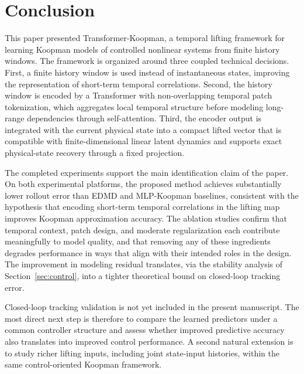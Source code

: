 \documentclass[journal]{IEEEtran}
\begin{document}
\section{Conclusion}
\label{sec:conclusion}

This paper presented Transformer-Koopman, a temporal lifting framework for learning Koopman models of controlled nonlinear systems from finite history windows. The framework is organized around three coupled technical decisions. First, a finite history window is used instead of instantaneous states, improving the representation of short-term temporal correlations. Second, the history window is encoded by a Transformer with non-overlapping temporal patch tokenization, which aggregates local temporal structure before modeling long-range dependencies through self-attention. Third, the encoder output is integrated with the current physical state into a compact lifted vector that is compatible with finite-dimensional linear latent dynamics and supports exact physical-state recovery through a fixed projection.

The completed experiments support the main identification claim of the paper. On both experimental platforms, the proposed method achieves substantially lower rollout error than EDMD and MLP-Koopman baselines, consistent with the hypothesis that encoding short-term temporal correlations in the lifting map improves Koopman approximation accuracy. The ablation studies confirm that temporal context, patch design, and moderate regularization each contribute meaningfully to model quality, and that removing any of these ingredients degrades performance in ways that align with their intended roles in the design. The improvement in modeling residual translates, via the stability analysis of Section~\ref{sec:control}, into a tighter theoretical bound on closed-loop tracking error.

Closed-loop tracking validation is not yet included in the present manuscript. The most direct next step is therefore to compare the learned predictors under a common controller structure and assess whether improved predictive accuracy also translates into improved control performance. A second natural extension is to study richer lifting inputs, including joint state-input histories, within the same control-oriented Koopman framework.
\end{document}
